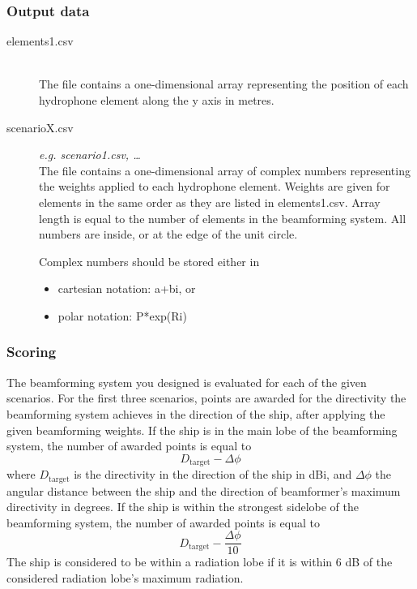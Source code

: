 \documentclass{article}
\begin{document}
\subsubsection*{Output data}

\begin{description}
	\item[elements1.csv] \,\\ The file contains a one-dimensional array 
	representing the position of each hydrophone element along the y axis in 
	metres.
	
	\item[scenarioX.csv] \textit{e.g. scenario1.csv, \ldots}\,\\ The file 
	contains a one-dimensional array of complex numbers representing the 
	weights applied to each hydrophone element. Weights are given for elements 
	in the same order as they are listed in \textsf{elements1.csv}. Array 
	length is equal to the number of elements in the beamforming system. All 
	numbers are inside, or at the edge of the unit circle.
	
	Complex numbers should be stored either in
	\begin{itemize}
		\item cartesian notation: \textsf{a+bi}, or
		\item polar notation: \textsf{P*exp(Ri)}
	\end{itemize}
\end{description}


\subsubsection*{Scoring}

The beamforming system you designed is evaluated for each of the given 
scenarios. For the first three scenarios, points are awarded for the 
directivity the beamforming system achieves in the direction of the ship, after 
applying the given beamforming weights. If the ship is in the main lobe of the 
beamforming system, the number of awarded points is equal to
\[ D_\textrm{target} - \varDelta \phi \]
where $D_\textrm{target}$ is the directivity in the direction of the ship in 
dBi, and $\varDelta \phi$ the angular distance between the ship and the 
direction of beamformer's maximum directivity in degrees. If the ship is within 
the strongest sidelobe of the beamforming system, the number of awarded points 
is equal to
\[ D_\textrm{target} - \dfrac{\varDelta \phi}{10} \]
The ship is considered to be within a radiation lobe if it is within 6 dB of 
the considered radiation lobe's maximum radiation.
\end{document}

